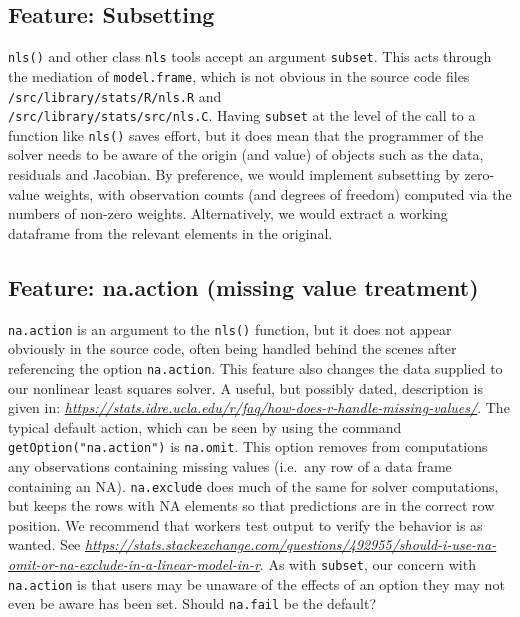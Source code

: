 \hypertarget{feature-subsetting}{%
\subsection{Feature: Subsetting}\label{feature-subsetting}}

\texttt{nls()} and other class \texttt{nls} tools accept an argument \texttt{subset}. This acts through
the mediation of \texttt{model.frame}, which is not obvious in the
source code files
\texttt{/src/library/stats/R/nls.R} and\\
\texttt{/src/library/stats/src/nls.C}.
Having \texttt{subset} at the level of the call to a function like
\texttt{nls()} saves effort, but it does mean that the programmer of the
solver needs to be aware of the
origin (and value) of objects such as the data, residuals and Jacobian.
By preference,
we would implement subsetting by zero-value weights, with observation counts
(and degrees of freedom) computed via the numbers of non-zero weights. Alternatively,
we would extract a working dataframe from the relevant elements in the original.

\hypertarget{feature-na.action-missing-value-treatment}{%
\subsection{Feature: na.action (missing value treatment)}\label{feature-na.action-missing-value-treatment}}

\texttt{na.action} is an argument to the \texttt{nls()} function, but it does not appear
obviously in the source code, often being handled behind the scenes after
referencing the option \texttt{na.action}. This feature also changes the data
supplied to our nonlinear least squares solver.
A useful, but possibly dated, description is given in:
\emph{\url{https://stats.idre.ucla.edu/r/faq/how-does-r-handle-missing-values/}}.
The typical default action, which can be seen by using the command
\texttt{getOption("na.action")}
is \texttt{na.omit}. This option removes from computations any observations
containing missing values (i.e.~any row of a data frame containing an NA).
\texttt{na.exclude} does much of the same for solver computations, but keeps the rows with
NA elements so that predictions are in the correct row position. We recommend that
workers test output to verify the behavior is as wanted.
See \emph{\url{https://stats.stackexchange.com/questions/492955/should-i-use-na-omit-or-na-exclude-in-a-linear-model-in-r}}.
As with \texttt{subset}, our concern with \texttt{na.action} is that users may be unaware of the
effects of an option they may not even be aware has been set. Should \texttt{na.fail} be the default?

